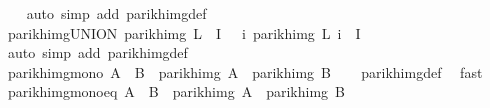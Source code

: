 \begin{isabellebody}
%
\isadelimproof
\ \ %
\endisadelimproof
%
\isatagproof
{}\isamarkupfalse%
\ {\isacharparenleft}{\kern0pt}auto\ simp\ add{\isacharcolon}{\kern0pt}\ parikh{\isacharunderscore}{\kern0pt}img{\isacharunderscore}{\kern0pt}def{\isacharparenright}{\kern0pt}%
\endisatagproof
{\isafoldproof}%
%
\isadelimproof
\isanewline
%
\endisadelimproof
\isanewline
{}\isamarkupfalse%
\ parikh{\isacharunderscore}{\kern0pt}img{\isacharunderscore}{\kern0pt}UNION{\isacharcolon}{\kern0pt}\ {\isachardoublequoteopen}parikh{\isacharunderscore}{\kern0pt}img\ {\isacharparenleft}{\kern0pt}{\isasymUnion}{\isacharparenleft}{\kern0pt}L\ {\isacharbackquote}{\kern0pt}\ I{\isacharparenright}{\kern0pt}{\isacharparenright}{\kern0pt}\ {\isacharequal}{\kern0pt}\ {\isasymUnion}\ {\isacharparenleft}{\kern0pt}{\isacharparenleft}{\kern0pt}{\isasymlambda}i{\isachardot}{\kern0pt}\ parikh{\isacharunderscore}{\kern0pt}img\ {\isacharparenleft}{\kern0pt}L\ i{\isacharparenright}{\kern0pt}{\isacharparenright}{\kern0pt}\ {\isacharbackquote}{\kern0pt}\ I{\isacharparenright}{\kern0pt}{\isachardoublequoteclose}\isanewline
%
\isadelimproof
\ \ %
\endisadelimproof
%
\isatagproof
{}\isamarkupfalse%
\ {\isacharparenleft}{\kern0pt}auto\ simp\ add{\isacharcolon}{\kern0pt}\ parikh{\isacharunderscore}{\kern0pt}img{\isacharunderscore}{\kern0pt}def{\isacharparenright}{\kern0pt}%
\endisatagproof
{\isafoldproof}%
%
\isadelimproof
\isanewline
%
\endisadelimproof
\isanewline
{}\isamarkupfalse%
\ parikh{\isacharunderscore}{\kern0pt}img{\isacharunderscore}{\kern0pt}mono{\isacharcolon}{\kern0pt}\ {\isachardoublequoteopen}A\ {\isasymsubseteq}\ B\ {\isasymLongrightarrow}\ parikh{\isacharunderscore}{\kern0pt}img\ A\ {\isasymsubseteq}\ parikh{\isacharunderscore}{\kern0pt}img\ B{\isachardoublequoteclose}\isanewline
%
\isadelimproof
\ \ %
\endisadelimproof
%
\isatagproof
{}\isamarkupfalse%
\ parikh{\isacharunderscore}{\kern0pt}img{\isacharunderscore}{\kern0pt}def\ \isamarkupfalse%
\ fast%
\endisatagproof
{\isafoldproof}%
%
\isadelimproof
\isanewline
%
\endisadelimproof
\isanewline
{}\isamarkupfalse%
\ parikh{\isacharunderscore}{\kern0pt}img{\isacharunderscore}{\kern0pt}mono{\isacharunderscore}{\kern0pt}eq{\isacharcolon}{\kern0pt}\ {\isachardoublequoteopen}A\ {\isacharequal}{\kern0pt}\ B\ {\isasymLongrightarrow}\ parikh{\isacharunderscore}{\kern0pt}img\ A\ {\isacharequal}{\kern0pt}\ parikh{\isacharunderscore}{\kern0pt}img\ B{\isachardoublequoteclose}\isanewline
%
\isadelimproof
\ \ %
\endisadelimproof
%
\isatagproof

\end{isabellebody}
